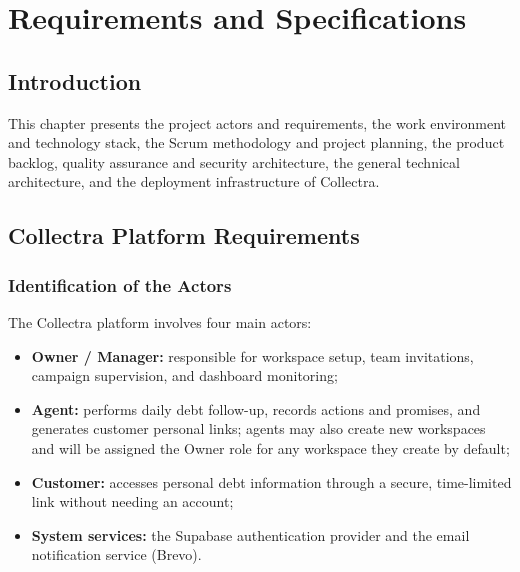 ﻿\documentclass[12pt,a4paper]{report}
\begin{document}
\clearpage
\chapter{Requirements and Specifications}

\section*{Introduction}
{}

This chapter presents the project actors and requirements, the work environment and
technology stack, the Scrum methodology and project planning, the product backlog,
quality assurance and security architecture, the general technical architecture,
and the deployment infrastructure of Collectra.

\section{Collectra Platform Requirements}

\subsection{Identification of the Actors}

The Collectra platform involves four main actors:
\begin{itemize}
  \item \textbf{Owner / Manager:} responsible for workspace setup, team invitations,
        campaign supervision, and dashboard monitoring;
  \item \textbf{Agent:} performs daily debt follow-up, records actions and promises,
      and generates customer personal links; agents may also create new workspaces and
      will be assigned the Owner role for any workspace they create by default;
  \item \textbf{Customer:} accesses personal debt information through a secure,
        time-limited link without needing an account;
  \item \textbf{System services:} the Supabase authentication provider and the
        email notification service (Brevo).
\end{itemize}
\end{document}
